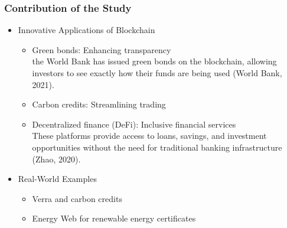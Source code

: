 \documentclass{beamer}
\begin{document}
\begin{frame}
    \frametitle{Contribution of the Study}
    \begin{itemize}
        \item Innovative Applications of Blockchain
        \begin{itemize}
            \item Green bonds: Enhancing transparency
            \\the World Bank has issued green bonds on the blockchain, allowing investors to see exactly how their funds are being used (World Bank, 2021).
            \item Carbon credits: Streamlining trading
            \item Decentralized finance (DeFi): Inclusive financial services
            \\These platforms provide access to loans, savings, and investment opportunities without the need for traditional banking infrastructure (Zhao, 2020).
        \end{itemize}
        \item Real-World Examples
        \begin{itemize}
            \item Verra and carbon credits
            \item Energy Web for renewable energy certificates
        \end{itemize}
    \end{itemize}
\end{frame}
\end{document}
